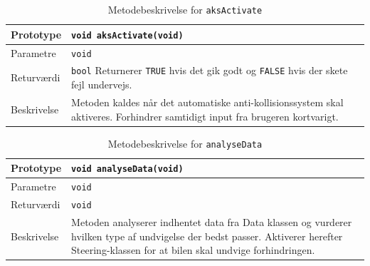 \begin{table}[h]
\begin{tabularx}{\textwidth}{| L{2.5 cm} | Z |} \hline
Prototype & \texttt{void aksActivate(void)} \\\hline
Parametre & \texttt{void}  \\\hline
Returværdi &  \texttt{bool} \newline Returnerer \texttt{TRUE} hvis det gik godt og \texttt{FALSE} hvis der skete fejl undervejs. \\\hline
Beskrivelse & Metoden kaldes når det automatiske anti-kollisionssystem skal aktiveres. Forhindrer samtidigt input fra brugeren kortvarigt. \\\hline
\end{tabularx}
\caption{Metodebeskrivelse for \texttt{aksActivate}}
\label{table:met_aks_aksActivate}
\end{table}

\begin{table}[h]
\begin{tabularx}{\textwidth}{| L{2.5 cm} | Z |} \hline
Prototype & \texttt{void analyseData(void)} \\\hline
Parametre & \texttt{void}  \\\hline
Returværdi &  \texttt{void}  \\\hline
Beskrivelse & Metoden analyserer indhentet data fra Data klassen og vurderer hvilken type af undvigelse der bedst passer. Aktiverer herefter Steering-klassen for at bilen skal undvige forhindringen. \\\hline
\end{tabularx}
\caption{Metodebeskrivelse for \texttt{analyseData}}
\label{table:met_aks_analyseData}
\end{table}